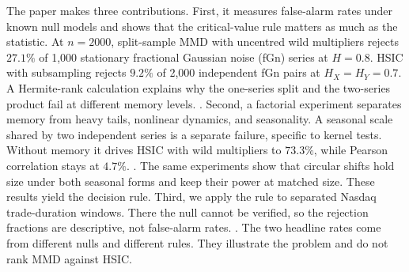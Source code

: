 The paper makes three contributions. First, it measures false-alarm rates under known null models and shows that the critical-value rule matters as much as the statistic. At $n=2000$, split-sample MMD with uncentred wild multipliers rejects $27.1\%$ of 1,000 stationary fractional Gaussian noise (fGn) series at $H=0.8$. HSIC with subsampling rejects $9.2\%$ of 2,000 independent fGn pairs at $H_X=H_Y=0.7$. A Hermite-rank calculation explains why the one-series split and the two-series product fail at different memory levels. . Second, a factorial experiment separates memory from heavy tails, nonlinear dynamics, and seasonality. A seasonal scale shared by two independent series is a separate failure, specific to kernel tests. Without memory it drives HSIC with wild multipliers to $73.3\%$, while Pearson correlation stays at $4.7\%$. . The same experiments show that circular shifts hold size under both seasonal forms and keep their power at matched size. These results yield the decision rule. Third, we apply the rule to separated Nasdaq trade-duration windows. There the null cannot be verified, so the rejection fractions are descriptive, not false-alarm rates. . The two headline rates come from different nulls and different rules. They illustrate the problem and do not rank MMD against HSIC.
